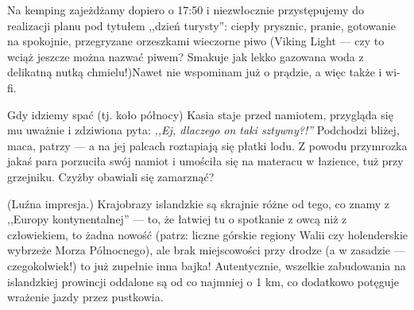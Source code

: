
Na kemping zajeżdżamy dopiero o 17:50 i niezwłocznie przystępujemy do realizacji planu pod tytułem ,,dzień turysty'': ciepły prysznic, pranie, gotowanie na spokojnie, przegryzane orzeszkami wieczorne piwo (Viking Light --- czy to wciąż jeszcze można nazwać piwem? Smakuje jak lekko gazowana woda z delikatną nutką chmielu!)\textellipsis Nawet nie wspominam już o prądzie, a więc także i wi-fi.

Gdy idziemy spać (tj. koło północy) Kasia staje przed namiotem, przygląda się mu uważnie i zdziwiona pyta: \emph{,,Ej, dlaczego on taki sztywny?!''} Podchodzi bliżej, maca, patrzy --- a na jej palcach roztapiają się płatki lodu. Z powodu przymrozka jakaś para porzuciła swój namiot i umościła się na materacu w łazience, tuż przy grzejniku. Czyżby obawiali się zamarznąć?


(Luźna impresja.) Krajobrazy islandzkie są skrajnie różne od tego, co znamy z ,,Europy kontynentalnej'' --- to, że łatwiej tu o spotkanie z owcą niż z człowiekiem, to żadna nowość (patrz: liczne górskie regiony Walii czy holenderskie wybrzeże Morza Północnego), ale brak miejscowości przy drodze (a w zasadzie --- czegokolwiek!) to już zupełnie inna bajka! Autentycznie, wszelkie zabudowania na islandzkiej prowincji oddalone są od  co najmniej o 1 km, co dodatkowo potęguje wrażenie jazdy przez pustkowia.


